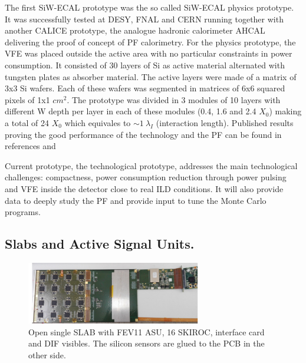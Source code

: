 \documentclass[journal]{IEEEtran}
\begin{document}
The first SiW-ECAL prototype was the so called SiW-ECAL physics prototype.
It was successfully tested at DESY, FNAL and CERN running together with another CALICE prototype,
the analogue hadronic calorimeter AHCAL delivering the proof of concept of PF calorimetry.
For the physics prototype, the VFE was placed outside the active area with no particular constraints in power consumption.
It consisted of 30 layers of Si as active material alternated with tungsten plates as absorber material.
The active layers were made of a matrix of 3x3 Si wafers. Each of these wafers was segmented in matrices of
6x6 squared pixels of 1x1 $cm^{2}$.
The prototype was divided in 3 modules of 10 layers with different W depth per layer in each of these modules
(0.4, 1.6 and 2.4 $X_{0}$) making a total of 24 $X_{0}$ which equivales to $\sim 1~\lambda_{I}$ (interaction length).
Published results proving the good performance of the technology and the PF can be found in references \cite{Adloff:2011ha,Anduze:2008hq,Adloff:2008aa,Adloff:2010xj,CALICE:2011aa} and \cite{Bilki:2014uep} 

Current prototype, the technological prototype, addresses the main technological challenges: compactness,
power consumption reduction through power pulsing and VFE inside the detector close to real ILD conditions.
It will also provide data to deeply study the PF and provide input to tune the Monte Carlo programs.

\subsection{Slabs and Active Signal Units.}

\begin{figure}[!t]
\centering
\includegraphics[width=3.0in]{shortslab-eps-converted-to.pdf}
\caption{Open single SLAB with FEV11 ASU, 16 SKIROC, interface card and DIF visibles. The silicon sensors are glued to the PCB in the other side.}
\label{shortslab}
\end{figure}
\end{document}
